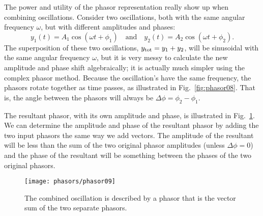 The power and utility of the phasor representation really show up
when combining oscillations. Consider two oscillations, both with the
same angular frequency $\omega$, but with different amplitudes and
phases:
\begin{equation}
y_1(t) = A_1\cos{(\omega t + \phi_1)}\quad \text{and} \quad
y_2(t) = A_2\cos{(\omega t + \phi_2)}.  
\end{equation}
The superposition of these two oscillations, $y_{\rm tot} = y_1 + y_2$,
will be sinusoidal with the same angular frequency $\omega$, 
but it is very messy to calculate the new amplitude and phase shift  
algebraically; it is actually much simpler
using the complex phasor method. Because the oscillation's have 
the same frequency, the phasors rotate together as time passes,
as illustrated in Fig.~\ref{fig:phasor08}.  That is, the angle
between the phasors will always be $\Delta\phi = \phi_2-\phi_1$.



The resultant phasor, with its own amplitude and phase, is illustrated
in Fig.~\ref{fig:phasor09}.  We can determine the amplitude and phase
of the resultant phasor by adding the two input phasors the same way we
add vectors.  The amplitude of the resultant will be less than the sum
of the two original phasor amplitudes (unless $\Delta\phi = 0$) and the
phase of the resultant will be something between the phases of the two
original phasors.

\begin{figure}
\begin{center}
 \texttt{[image: phasors/phasor09]} 
\caption{\label{fig:phasor09}The combined oscillation is described by 
a phasor that is the vector sum of the two separate phasors.}
\end{center}
\end{figure}

